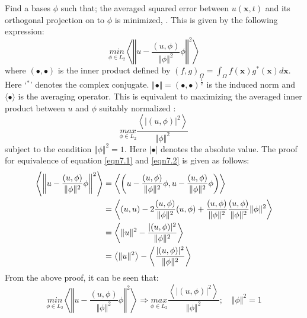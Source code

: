 \documentclass[10pt,letterpaper, onecolumn]{article}
\begin{document}
\noindent 
Find a bases $\phi$ such that; the averaged squared error between $u(\bm{x},t)$ and its orthogonal projection on to $\phi$ is minimized, \cite{philipbook2012turbulence}. This is given by the following expression:
%
\begin{equation}
\underset{\phi \in L_2}{min} \left \langle   \left \Vert    u - \frac{(u, \phi)}{\Vert \phi \Vert^2} \phi    \right \Vert^2      \right \rangle
\label{eqn7.1}
\end{equation}
%
where $(\bullet,\bullet)$ is the inner product defined by $(f,g)_{\Omega} = \int_{\Omega} f(\bm{x}) g^*(\bm{x}) d\bm{x}$. Here `$^*$' denotes the complex conjugate. $\Vert \bullet \Vert = (\bullet , \bullet)^{\frac{1}{2}}$ is the induced norm and $\langle \bullet \rangle$ is the averaging operator. This is equivalent to maximizing the averaged inner product between $u$ and $\phi$ suitably normalized \cite{ philipbook2012turbulence, kerschen2005method}:
%
\begin{equation}
\underset{\phi \in L_2}{max} \frac{ \left \langle  \vert (u,\phi) \vert^2  \right \rangle  }{\Vert \phi \Vert^2}
\label{eqn7.2}
\end{equation}
%
subject to the condition $\Vert \phi \Vert^2 = 1$. Here $\vert \bullet \vert$ denotes the absolute value. The proof for equivalence of equation \eqref{eqn7.1} and \eqref{eqn7.2} is given as follows:
%
\begin{align}
\left \langle   \left \Vert    u - \frac{(u, \phi)}{\Vert \phi \Vert^2} \phi    \right \Vert^2      \right \rangle &= 
\left \langle   \left (    u - \frac{(u, \phi)}{\Vert \phi \Vert^2} \phi  , u - \frac{(u, \phi)}{\Vert \phi \Vert^2} \phi   \right )      \right \rangle \notag \\
&= \left \langle (u,u) - 2 \frac{(u,\phi) }{\Vert \phi \Vert^2} (u,\phi) 
+   \frac{(u,\phi) }{\Vert \phi \Vert^2} \frac{(u,\phi) }{\Vert \phi \Vert^2} \Vert \phi \Vert^2   \right \rangle \notag  \\
&= \left \langle  \Vert u \Vert^2  -  \frac{\vert (u,\phi) \vert^2 }{\Vert \phi \Vert^2}  \right \rangle \notag \\
&= \left \langle  \Vert u \Vert^2 \right \rangle  - \left \langle  \frac{\vert (u,\phi) \vert^2 }{\Vert \phi \Vert^2}  \right \rangle
\end{align}
%
From the above proof, it can be seen that:
%
\begin{equation}
\underset{\phi \in L_2}{min} \left \langle   \left \Vert    u - \frac{(u, \phi)}{\Vert \phi \Vert^2} \phi    \right \Vert^2      \right \rangle
\Rightarrow \underset{\phi \in L_2}{max} \frac{ \left \langle  \vert (u,\phi) \vert^2  \right \rangle  }{\Vert \phi \Vert^2}; \quad \Vert \phi \Vert^2 = 1
\end{equation}
%
\end{document}
